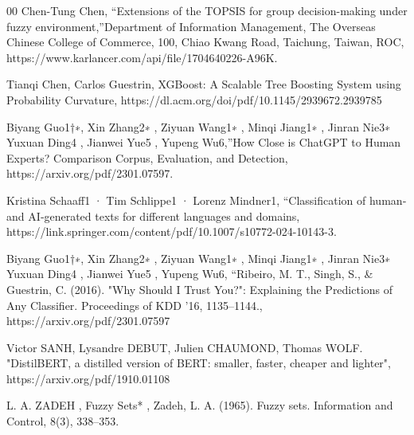 \documentclass[conference]{IEEEtran}
\begin{document}
\begin{thebibliography}{00}
  Chen-Tung Chen, ``Extensions of the TOPSIS for group decision-making
under fuzzy environment,''Department of Information Management, The Overseas Chinese College of Commerce, 100, Chiao Kwang Road,
Taichung, Taiwan, ROC, https://www.karlancer.com/api/file/1704640226-A96K.



 Tianqi Chen, Carlos Guestrin, XGBoost: A Scalable Tree Boosting System
using Probability Curvature, https://dl.acm.org/doi/pdf/10.1145/2939672.2939785





 Biyang Guo1†∗, Xin Zhang2∗
, Ziyuan Wang1∗
, Minqi Jiang1∗
, Jinran Nie3∗
Yuxuan Ding4
, Jianwei Yue5
, Yupeng Wu6,''How Close is ChatGPT to Human Experts?
Comparison Corpus, Evaluation, and Detection, https://arxiv.org/pdf/2301.07597.




 Kristina Schaaff1  · Tim Schlippe1
 · Lorenz Mindner1, ``Classification of human‑ and AI‑generated texts for different
languages and domains, https://link.springer.com/content/pdf/10.1007/s10772-024-10143-3.




Biyang Guo1†∗, Xin Zhang2∗
, Ziyuan Wang1∗
, Minqi Jiang1∗
, Jinran Nie3∗
Yuxuan Ding4
, Jianwei Yue5
, Yupeng Wu6, ``Ribeiro, M. T., Singh, S., \& Guestrin, C. (2016). "Why Should I Trust You?": Explaining the Predictions of Any Classifier. Proceedings of KDD '16, 1135–1144., https://arxiv.org/pdf/2301.07597





Victor SANH, Lysandre DEBUT, Julien CHAUMOND, Thomas WOLF. "DistilBERT, a distilled version of BERT: smaller,
faster, cheaper and lighter", https://arxiv.org/pdf/1910.01108 



 L. A. ZADEH , Fuzzy Sets* , Zadeh, L. A. (1965). Fuzzy sets. Information and Control, 8(3), 338–353.


\end{thebibliography}
\vspace{12pt}
\end{document}
